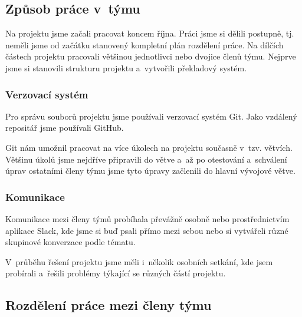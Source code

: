 \documentclass[a4paper, 11pt]{article}
\begin{document}
	\subsection{Způsob práce v~týmu}

	Na projektu jsme začali pracovat koncem října. Práci jsme si dělili postupně, tj. neměli jsme od začátku
	stanovený kompletní plán rozdělení práce. Na dílčích částech projektu pracovali většinou jednotlivci nebo
	dvojice členů týmu. Nejprve jsme si stanovili strukturu projektu a~vytvořili překladový systém.

	\subsubsection{Verzovací systém}

	Pro správu souborů projektu jsme používali verzovací systém Git. Jako vzdálený repositář jsme používali \mbox{GitHub}.

	Git nám umožnil pracovat na více úkolech na projektu současně v~tzv. větvích. Většinu úkolů jsme nejdříve připravili
	do větve a~až po otestování a~schválení úprav ostatními členy týmu jsme tyto úpravy začlenili do hlavní
	vývojové větve.

	\subsubsection{Komunikace}

	Komunikace mezi členy týmů probíhala převážně osobně nebo prostřednictvím aplikace Slack, kde jsme si buď
	psali přímo mezi sebou nebo si vytvářeli různé skupinové konverzace podle tématu.

	V~průběhu řešení projektu jsme měli i~několik osobních setkání, kde jsem probírali a~řešili problémy
	týkající se různých částí projektu.


	\subsection{Rozdělení práce mezi členy týmu}
\end{document}
